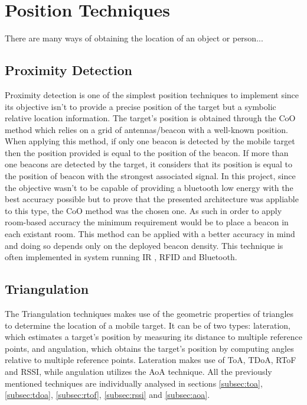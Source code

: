 \section{Position Techniques}
\label{sec:techniques}

There are many ways of obtaining the location of an object or person...


\subsection{Proximity Detection}
\label{subsec:prox}

Proximity detection is one of the simplest position techniques to implement since its objective isn't to provide a precise position of the target but a symbolic relative location information. The target's position is obtained through the \ac{CoO} method which relies on a grid of antennas/beacon with a well-known position. When applying this method, if only one beacon is detected by the mobile target then the position provided is equal to the position of the beacon. If more than one beacons are detected by the target, it considers that its position is equal to the position of beacon with the strongest associated signal. In this project, since the objective wasn't to be capable of providing a bluetooth low energy with the best accuracy possible but to prove that the presented architecture was appliable to this type, the \ac{CoO} method was the chosen one. As such in order to apply room-based accuracy the minimum requirement would be to place a beacon in each existant room. This method can be applied with a better accuracy in mind and doing so depends only on the deployed beacon density. This technique is often implemented in system running \ac{IR} , \ac{RFID} and Bluetooth.

\subsection{Triangulation}
\label{subsec:tri}

The Triangulation techniques makes use of the geometric properties of triangles to determine the location of a mobile target. It can be of two types: lateration, which estimates a target's position by measuring its distance to multiple reference points, and angulation, which obtains the target's position by computing angles relative to multiple reference points. Lateration makes use of \ac{ToA}, \ac{TDoA}, \ac{RToF} and \ac{RSSI}, while angulation utilizes the \ac{AoA} technique. All the previously mentioned techniques are individually analysed in sections \ref{subsec:toa}, \ref{subsec:tdoa}, \ref{subsec:rtof}, \ref{subsec:rssi} and \ref{subsec:aoa}. 

